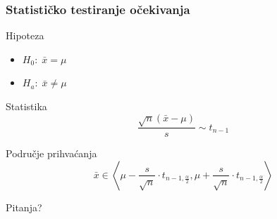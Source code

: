 \documentclass{beamer}
\begin{document}
\begin{frame}
	\frametitle{Statističko testiranje očekivanja}
	\begin{block}{Hipoteza}
		\centering
		\begin{itemize}
			\item $H_0:\; \bar{x} = \mu$
			\item $H_a:\; \bar{x} \ne \mu$
		\end{itemize}
	\end{block}
	\begin{block}{Statistika}
		\[\frac{\sqrt{n} (\bar{x} - \mu)}{s} \sim t_{n-1}\]
	\end{block}
	\begin{block}{Područje prihvaćanja}
		\[
		\bar{x} \in \left<\mu - \frac{s}{\sqrt{n}} \cdot t_{n-1, \frac{\alpha}{2}}, \mu + \frac{s}{\sqrt{n}} \cdot t_{n-1, \frac{\alpha}{2}} \right> \]

	\end{block}
\end{frame}

\begin{frame}
\Huge{\centerline{Pitanja?}}
\end{frame}
\end{document}
